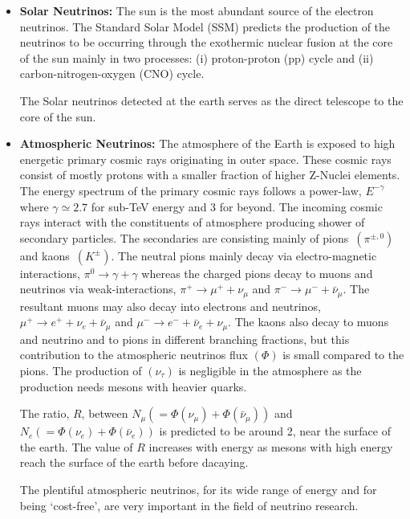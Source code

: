 \begin{itemize}
\item \textbf{Solar Neutrinos:} The sun is the most abundant source of the electron neutrinos. The Standard Solar Model (SSM)\cite{SSM} predicts the production of the neutrinos to be occurring through the exothermic nuclear fusion at the core of the sun mainly in two processes: (i) proton-proton (pp) cycle and (ii) carbon-nitrogen-oxygen (CNO) cycle.

  The Solar neutrinos detected at the earth serves as the direct telescope to the core of the sun.
  
\item \textbf{Atmospheric Neutrinos:} The atmosphere of the Earth is exposed to high energetic primary cosmic rays originating in outer space. These cosmic rays consist of mostly protons with a smaller fraction of higher \mbox{Z-Nuclei} elements\cite{cosmic1}. The energy spectrum of the primary cosmic rays follows a power-law, $E^{-\gamma}$ where $\gamma\simeq 2.7$ for sub-TeV energy and 3 for beyond.  The incoming cosmic rays interact with the constituents of atmosphere producing shower of secondary particles\cite{thebook}. The secondaries are consisting mainly of \mbox{pions $\left(\pi^{\pm,0}\right)$} and \mbox{kaons $\left(K^{\pm}\right)$}. The neutral pions mainly decay via electro-magnetic interactions, $\pi^0 \rightarrow \gamma+\gamma$ whereas the charged pions decay to muons and neutrinos via weak-interactions, $\pi^+ \rightarrow \mu^+ + \nu_{\mu}$ and $\pi^- \rightarrow \mu^- + \bar{\nu}_{\mu}$. The resultant muons may also decay into electrons and neutrinos, $\mu^+ \rightarrow e^+ + \nu_{e} + \bar{\nu}_{\mu}$ and $\mu^- \rightarrow e^- + \bar{\nu}_{e} + \nu_{\mu}$.  The kaons also decay to muons and neutrino and to pions in different branching fractions, but this contribution to the atmospheric neutrinos flux $\left(\Phi\right)$ is small compared to the pions. The production of $\left(\nu_{\tau}\right)$ is negligible in the atmosphere as the production needs mesons with heavier quarks.

  The ratio, $R$, between $N_{\mu}\left(=\Phi\left(\nu_{\mu}\right)+\Phi\left(\bar{\nu}_{\mu}\right)\right)$ and $N_{e}\left(=\Phi\left(\nu_{e}\right)+\Phi\left(\bar{\nu}_{e}\right)\right)$ is predicted to be around 2, near the surface of the earth. The value of $R$ increases with energy as mesons with high energy reach the surface of the earth before dacaying.

  The plentiful atmospheric neutrinos, for its wide range of energy and for being `cost-free', are very important in the field of neutrino research.
  

\end{itemize}
